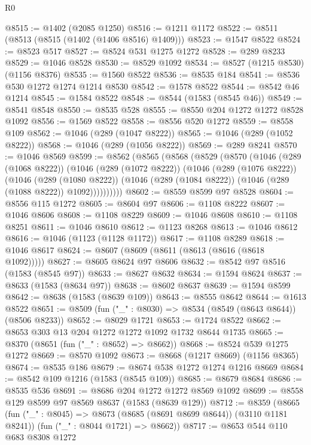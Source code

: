 \begin{lexlean}{R0}
\begin{coremodule}
@8515 := @1402 (@2085 @1250)
@8516 := @1211 @1172
@8522 := @8511 (@8513 (@8515 (@1402 (@1406 @8516) @1409)))
@8523 := @1547 @8522
@8524 := @8523 @517
@8527 := @8524 @531 @1275 @1272
@8528 := @289 @8233
@8529 := @1046 @8528
@8530 := @8529 @1092
@8534 := @8527 (@1215 @8530) (@1156 @8376)
@8535 := @1560 @8522
@8536 := @8535 @184
@8541 := @8536 @530 @1272 @1274 @1214 @8530
@8542 := @1578 @8522
@8544 := @8542 @46 @1214
@8545 := @1584 @8522
@8548 := @8544 (@1583 (@8545 @46))
@8549 := @8541 @8548
@8550 := @8535 @528
@8555 := @8550 @204 @1272 @1272 @8528 @1092
@8556 := @1569 @8522
@8558 := @8556 @520 @1272
@8559 := @8558 @109
@8562 := @1046 (@289 (@1047 @8222))
@8565 := @1046 (@289 (@1052 @8222))
@8568 := @1046 (@289 (@1056 @8222))
@8569 := @289 @8241
@8570 := @1046 @8569
@8599 := @8562
    (@8565
      (@8568
        (@8529
          (@8570
            (@1046
              (@289 (@1068 @8222))
              (@1046
                (@289 (@1072 @8222))
                (@1046
                  (@289 (@1076 @8222))
                  (@1046
                    (@289 (@1080 @8222))
                    (@1046 (@289 (@1084 @8222)) (@1046 (@289 (@1088 @8222)) @1092))))))))))
@8602 := @8559 @8599 @97 @8528
@8604 := @8556 @115 @1272
@8605 := @8604 @97
@8606 := @1108 @8222
@8607 := @1046 @8606
@8608 := @1108 @8229
@8609 := @1046 @8608
@8610 := @1108 @8251
@8611 := @1046 @8610
@8612 := @1123 @8268
@8613 := @1046 @8612
@8616 := @1046 (@1123 (@1128 @1172))
@8617 := @1108 @8289
@8618 := @1046 @8617
@8624 := @8607 (@8609 (@8611 (@8613 (@8616 (@8618 @1092)))))
@8627 := @8605 @8624 @97 @8606
@8632 := @8542 @97 @8516 (@1583 (@8545 @97))
@8633 := @8627 @8632
@8634 := @1594 @8624
@8637 := @8633 (@1583 (@8634 @97))
@8638 := @8602 @8637
@8639 := @1594 @8599
@8642 := @8638 (@1583 (@8639 @109))
@8643 := @8555 @8642
@8644 := @1613 @8522
@8651 := @8509 (fun ("_" : @8030) => @8534 (@8549 (@8643 @8644)) (@8506 @8233))
@8652 := @8029 @1721
@8653 := @1724 @8522
@8662 := @8653 @303 @13 @204 @1272 @1272 @1092 @1732 @8644 @1735
@8665 := @8370 (@8651 (fun ("_" : @8652) => @8662))
@8668 := @8524 @539 @1275 @1272
@8669 := @8570 @1092
@8673 := @8668 (@1217 @8669) (@1156 @8365)
@8674 := @8535 @186
@8679 := @8674 @538 @1272 @1274 @1216 @8669
@8684 := @8542 @109 @1216 (@1583 (@8545 @109))
@8685 := @8679 @8684
@8686 := @8535 @536
@8691 := @8686 @204 @1272 @1272 @8569 @1092
@8699 := @8558 @129 @8599 @97 @8569 @8637 (@1583 (@8639 @129))
@8712 := @8359
    (@8665
      (fun ("_" : @8045) => @8673 (@8685 (@8691 @8699 @8644)) (@3110 @1181 @8241))
      (fun ("_" : @8044 @1721) => @8662))
@8717 := @8653 @544 @110 @683 @8308 @1272

\end{coremodule}
\end{lexlean}
